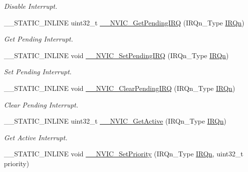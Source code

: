 \begin{DoxyCompactItemize}
\begin{DoxyCompactList}\small\item\em Disable Interrupt. \end{DoxyCompactList}\item 
\+\_\+\+\_\+\+S\+T\+A\+T\+I\+C\+\_\+\+I\+N\+L\+I\+NE uint32\+\_\+t \mbox{\hyperlink{group___c_m_s_i_s___core___n_v_i_c_functions_ga5a92ca5fa801ad7adb92be7257ab9694}{\+\_\+\+\_\+\+N\+V\+I\+C\+\_\+\+Get\+Pending\+I\+RQ}} (I\+R\+Qn\+\_\+\+Type \mbox{\hyperlink{group___interrupt__vector__numbers_ga666eb0caeb12ec0e281415592ae89083}{I\+R\+Qn}})
\begin{DoxyCompactList}\small\item\em Get Pending Interrupt. \end{DoxyCompactList}\item 
\+\_\+\+\_\+\+S\+T\+A\+T\+I\+C\+\_\+\+I\+N\+L\+I\+NE void \mbox{\hyperlink{group___c_m_s_i_s___core___n_v_i_c_functions_gaabefdd4b790b9a7308929938c0c1e1ad}{\+\_\+\+\_\+\+N\+V\+I\+C\+\_\+\+Set\+Pending\+I\+RQ}} (I\+R\+Qn\+\_\+\+Type \mbox{\hyperlink{group___interrupt__vector__numbers_ga666eb0caeb12ec0e281415592ae89083}{I\+R\+Qn}})
\begin{DoxyCompactList}\small\item\em Set Pending Interrupt. \end{DoxyCompactList}\item 
\+\_\+\+\_\+\+S\+T\+A\+T\+I\+C\+\_\+\+I\+N\+L\+I\+NE void \mbox{\hyperlink{group___c_m_s_i_s___core___n_v_i_c_functions_ga562a86dbdf14827d0fee8fdafb04d191}{\+\_\+\+\_\+\+N\+V\+I\+C\+\_\+\+Clear\+Pending\+I\+RQ}} (I\+R\+Qn\+\_\+\+Type \mbox{\hyperlink{group___interrupt__vector__numbers_ga666eb0caeb12ec0e281415592ae89083}{I\+R\+Qn}})
\begin{DoxyCompactList}\small\item\em Clear Pending Interrupt. \end{DoxyCompactList}\item 
\+\_\+\+\_\+\+S\+T\+A\+T\+I\+C\+\_\+\+I\+N\+L\+I\+NE uint32\+\_\+t \mbox{\hyperlink{group___c_m_s_i_s___core___n_v_i_c_functions_gaa2837003c28c45abf193fe5e8d27f593}{\+\_\+\+\_\+\+N\+V\+I\+C\+\_\+\+Get\+Active}} (I\+R\+Qn\+\_\+\+Type \mbox{\hyperlink{group___interrupt__vector__numbers_ga666eb0caeb12ec0e281415592ae89083}{I\+R\+Qn}})
\begin{DoxyCompactList}\small\item\em Get Active Interrupt. \end{DoxyCompactList}\item 
\+\_\+\+\_\+\+S\+T\+A\+T\+I\+C\+\_\+\+I\+N\+L\+I\+NE void \mbox{\hyperlink{group___c_m_s_i_s___core___n_v_i_c_functions_ga505338e23563a9c074910fb14e7d45fd}{\+\_\+\+\_\+\+N\+V\+I\+C\+\_\+\+Set\+Priority}} (I\+R\+Qn\+\_\+\+Type \mbox{\hyperlink{group___interrupt__vector__numbers_ga666eb0caeb12ec0e281415592ae89083}{I\+R\+Qn}}, uint32\+\_\+t priority)

\end{DoxyCompactItemize}
